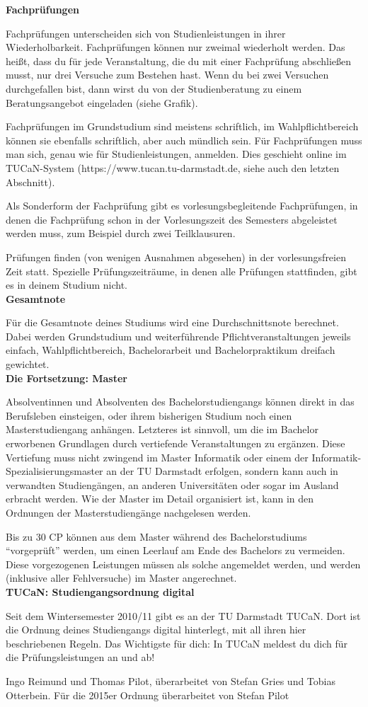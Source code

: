 {	\noindent\textbf{Fachprüfungen}

	Fachprüfungen unterscheiden sich von Studienleistungen in ihrer Wiederholbarkeit. Fachprüfungen können nur zweimal wiederholt werden. Das heißt, dass du für jede Veranstaltung, die du mit einer Fachprüfung abschließen musst, nur drei Versuche zum Bestehen hast. Wenn du bei zwei Versuchen durchgefallen bist, dann wirst du von der Studienberatung zu einem Beratungsangebot eingeladen (siehe Grafik).


	Fachprüfungen im Grundstudium sind meistens schriftlich, im Wahlpflichtbereich können sie ebenfalls schriftlich, aber auch mündlich sein. Für Fachprüfungen muss man sich, genau wie für Studienleistungen, anmelden. Dies geschieht online im TUCaN-System (https://www.tucan.tu-darmstadt.de, siehe auch den letzten Abschnitt).

	Als Sonderform der Fachprüfung gibt es vorlesungsbegleitende Fachprüfungen, in denen die Fachprüfung schon in der Vorlesungszeit des Semesters abgeleistet werden muss, zum Beispiel durch zwei Teilklausuren.

	Prüfungen finden (von wenigen Ausnahmen abgesehen) in der vorlesungsfreien Zeit statt. Spezielle Prüfungszeiträume, in denen alle Prüfungen stattfinden, gibt es in deinem Studium nicht.\\

	\noindent\textbf{Gesamtnote}

	Für die Gesamtnote deines Studiums wird eine Durchschnittsnote berechnet. Dabei werden Grundstudium und weiterführende Pflichtveranstaltungen jeweils einfach, Wahlpflichtbereich, Bachelorarbeit und Bachelorpraktikum dreifach gewichtet.\\

	\noindent\textbf{Die Fortsetzung: Master}

	Absolventinnen und Absolventen des Bachelorstudiengangs können direkt in das Berufsleben einsteigen, oder ihrem bisherigen Studium noch einen Masterstudiengang anhängen. Letzteres ist sinnvoll, um die im Bachelor erworbenen Grundlagen durch vertiefende Veranstaltungen zu ergänzen. Diese Vertiefung muss nicht zwingend im Master Informatik oder einem der Informatik-Spezialisierungsmaster an der TU Darmstadt erfolgen, sondern kann auch in verwandten Studiengängen, an anderen Universitäten oder sogar im Ausland erbracht werden. Wie der Master im Detail organisiert ist, kann in den Ordnungen der Masterstudiengänge nachgelesen werden.

	Bis zu 30 CP können aus dem Master während des Bachelorstudiums "`vorgeprüft"' werden, um einen Leerlauf am Ende des Bachelors zu vermeiden. Diese vorgezogenen Leistungen müssen als solche angemeldet werden, und werden (inklusive aller Fehlversuche) im Master angerechnet.\\

	\noindent\textbf{TUCaN: Studiengangsordnung digital}

	Seit dem Wintersemester 2010/11 gibt es an der TU Darmstadt TUCaN. Dort ist die Ordnung deines Studiengangs digital hinterlegt, mit all ihren hier beschriebenen Regeln. Das Wichtigste für dich: In TUCaN meldest du dich für die Prüfungsleistungen an und ab!
}
{Ingo Reimund und Thomas Pilot, überarbeitet von Stefan Gries und Tobias Otterbein. Für die 2015er Ordnung überarbeitet von Stefan Pilot}
